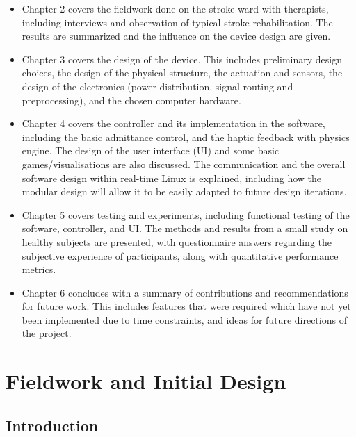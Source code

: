 \documentclass[12pt]{report}
\begin{document}
\begin{itemize}

\item Chapter 2 covers the fieldwork done on the stroke ward with therapists, including interviews and observation of typical stroke rehabilitation. The results are summarized and the influence on the device design are given. 

\item Chapter 3 covers the design of the device. This includes preliminary design choices, the design of the physical structure, the actuation and sensors, the design of the electronics (power distribution, signal routing and preprocessing), and the chosen computer hardware. 

\item Chapter 4 covers the controller and its implementation in the software, including the basic admittance control, and the haptic feedback with physics engine. The design of the user interface (UI) and some basic games/visualisations are also discussed. The communication and the overall software design within real-time Linux is explained, including how the modular design will allow it to be easily adapted to future design iterations. 

\item Chapter 5 covers testing and experiments, including functional testing of the software, controller, and UI. The methods and results from a small study on healthy subjects are presented, with questionnaire answers regarding the subjective experience of participants, along with quantitative performance metrics. 

\item Chapter 6 concludes with a summary of contributions and recommendations for future work. This includes features that were required which have not yet been implemented due to time constraints, and ideas for future directions of the project. 


\end{itemize}

\chapter{Fieldwork and Initial Design} 

\section{Introduction}
\end{document}
